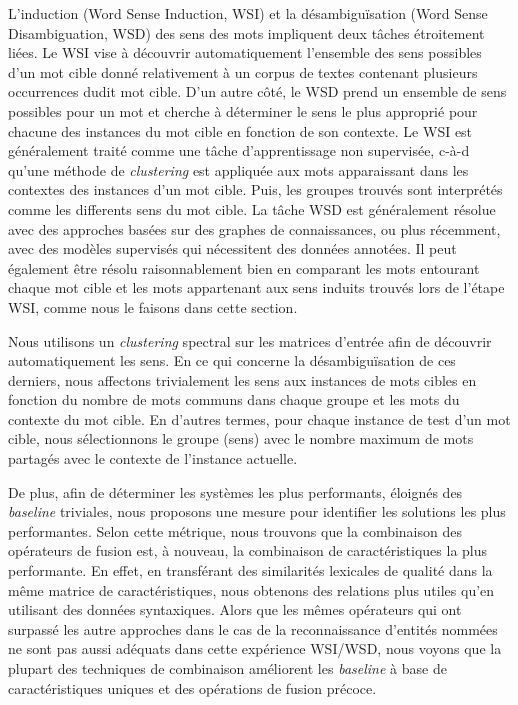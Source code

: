 \documentclass[a4paper,11pt,twoside]{article}
\begin{document}
L'induction (Word Sense Induction, WSI) et la désambiguïsation (Word Sense Disambiguation, WSD) des sens des mots impliquent deux tâches étroitement liées. Le WSI vise à découvrir automatiquement l'ensemble des sens possibles d'un mot cible donné relativement à un corpus de textes contenant plusieurs occurrences dudit mot cible. D'un autre côté, le WSD prend un ensemble de sens possibles pour un mot et cherche à déterminer le sens le plus approprié pour chacune des instances du mot cible en fonction de son contexte. Le WSI est généralement traité comme une tâche d'apprentissage non supervisée, c-à-d qu'une méthode de \textit{clustering} est appliquée aux mots apparaissant dans les contextes des instances d'un mot cible. Puis, les groupes trouvés sont interprétés comme les differents sens du mot cible. La tâche WSD est généralement résolue avec des approches basées sur des graphes de connaissances, ou plus récemment, avec des modèles supervisés qui nécessitent des données annotées. Il peut également être résolu raisonnablement bien en comparant les mots entourant chaque mot cible et les mots appartenant aux sens induits trouvés lors de l'étape WSI, comme nous le faisons dans cette section.

Nous utilisons un \textit{clustering} spectral sur les matrices d'entrée afin de découvrir automatiquement les sens. En ce qui concerne la désambiguïsation de ces derniers, nous affectons trivialement les sens aux instances de mots cibles en fonction du nombre de mots communs dans chaque groupe et les mots du contexte du mot cible. En d'autres termes, pour chaque instance de test d'un mot cible, nous sélectionnons le groupe (sens) avec le nombre maximum de mots partagés avec le contexte de l'instance actuelle.

De plus, afin de déterminer les systèmes les plus performants, éloignés des \textit{baseline} triviales, nous proposons une mesure pour identifier les solutions les plus performantes. Selon cette métrique, nous trouvons que la combinaison des opérateurs de fusion est, à nouveau, la combinaison de caractéristiques la plus performante. En effet, en transférant des similarités lexicales de qualité dans la même matrice de caractéristiques, nous obtenons des relations plus utiles qu'en utilisant des données syntaxiques. Alors que les mêmes opérateurs qui ont surpassé les autre approches dans le cas de la reconnaissance d'entités nommées ne sont pas aussi adéquats dans cette expérience WSI/WSD, nous voyons que la plupart des techniques de combinaison améliorent les \textit{baseline} à base de caractéristiques uniques et des opérations de fusion précoce.
\end{document}
